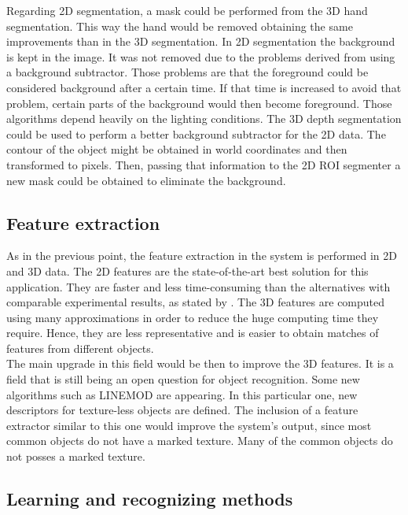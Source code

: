 	Regarding 2D segmentation, a mask could be performed from the 3D hand segmentation. 
	This way the hand would be removed obtaining the same improvements than in the 3D segmentation. 
	In 2D segmentation the background is kept in the image. 
	It was not removed due to the problems derived from using a background subtractor. 
	Those problems are that the foreground could be considered background after a certain time. 
	If that time is increased to avoid that problem, certain parts of the background would then become foreground. 
	Those algorithms depend heavily on the lighting conditions. 
	The 3D depth segmentation could be used to perform a better background subtractor for the 2D data. 
	The contour of the object might be obtained in world coordinates and then transformed to pixels. 
	Then, passing that information to the 2D ROI segmenter a new mask could be obtained to eliminate the background. 
	\\



	\subsection{Feature extraction}

	As in the previous point, the feature extraction in the system is performed in 2D and 3D data. 
	The 2D features are the state-of-the-art best solution for this application. 
	They are faster and less time-consuming than the alternatives with comparable experimental results, as stated by \cite{Miksik2012}. 
	The 3D features are computed using many approximations in order to reduce the huge computing time they require. 
	Hence, they are less representative and is easier to obtain matches of features from different objects. 
	\\

	The main upgrade in this field would be then to improve the 3D features. 
	It is a field that is still being an open question for object recognition.
	Some new algorithms such as LINEMOD \cite{Hinterstoisser2012} are appearing. 
	In this particular one, new descriptors for texture-less objects are defined. 
	The inclusion of a feature extractor similar to this one would improve the system's output, since most common objects do not have a marked texture.
	Many of the common objects do not posses a marked texture. 
	\\ 

	\subsection{Learning and recognizing methods}


